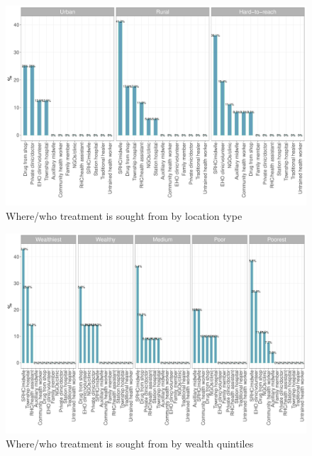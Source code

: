 \documentclass[12pt,a4paper]{article}
\begin{document}
\begin{figure}[H]

{\centering \includegraphics{kayahReport_files/figure-latex/diarrhoea5plot-1} 

}

\caption{Where/who treatment is sought from by location type}\label{fig:diarrhoea5plot}
\end{figure}

\begin{figure}[H]

{\centering \includegraphics{kayahReport_files/figure-latex/diarrhoea6plot-1} 

}

\caption{Where/who treatment is sought from by wealth quintiles}\label{fig:diarrhoea6plot}
\end{figure}
\end{document}
